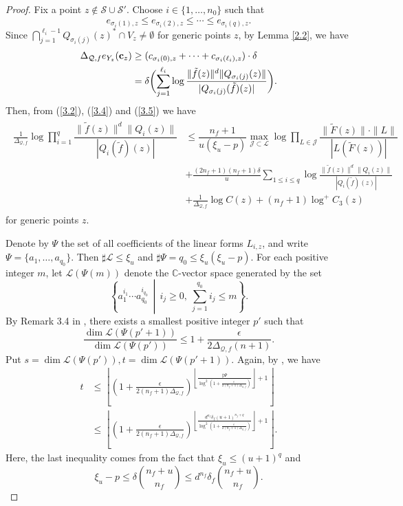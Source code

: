 \documentclass[12pt,leqno]{amsart}
\newcommand{\C}{{\mathbb{C}}}
\numberwithin{equation}{section}
\begin{document}
\begin{proof}
Fix a point $z\not\in\mathcal S\cup \mathcal S'$. Choose $i\in\{1,\ldots,n_0\}$ such that
$$ e_{\sigma_i(1),z}\le e_{\sigma_i(2),z}\le\cdots\le e_{\sigma_i(q),z}.$$
Since $\bigcap_{j=1}^{\ell_i-1}Q_{\sigma_i(j)}(z)^*\cap V_z\ne\emptyset$ for generic points $z$, by Lemma \ref{2.2}, we have
\begin{align}\label{3.5}
\begin{split}
\Delta_{\mathcal Q,f}e_{Y_z}({\bf c}_z)&\ge (c_{\sigma_i(0),z}+\cdots +c_{\sigma_i(\ell_i),z})\cdot\delta\\
&=\delta\biggl(\sum_{j=1}^{\ell_i}\log\frac{\|\tilde f(z)\|^d\|Q_{\sigma_i(j)}(z)\|}{|Q_{\sigma_i(j)}(\tilde f)(z)|}\biggl ).
\end{split}
\end{align}
Then, from (\ref{3.2}), (\ref{3.4}) and (\ref{3.5}) we have
\begin{align}\label{3.6}
\begin{split}
\frac{1}{\Delta_{\mathcal Q,f}}\log \prod_{i=1}^q\dfrac{\|\tilde f (z)\|^d\|Q_i(z)\|}{|Q_i(\tilde f)(z)|}
&\le\dfrac{n_f+1}{u(\xi_u-p)}\max_{\mathcal J\subset\mathcal L}\log\prod_{L\in\mathcal J}\dfrac{\|\tilde F(z)\|\cdot \|L\|}{|L(\tilde F(z))|}\\
&+\frac{(2n_f+1)(n_f+1)\delta}{u}\sum_{1\le i\le q}\log\frac{\|\tilde f(z)\|^d\|Q_{i}(z)\|}{|Q_{i}(\tilde f)(z)|}\\
&+\frac{1}{\Delta_{\mathcal Q,f}}\log C(z)+(n_f+1)\log^+C_3(z)
\end{split}
\end{align}
for generic points $z$.

Denote by $\Psi$ the set of all coefficients of the linear forms $L_{i,z}$, and write $\Psi=\{a_1,\ldots,a_{q_0}\}.$
Then $\sharp\mathcal L\le \xi_u$ and $\sharp\Psi=q_0\le \xi_u(\xi_u-p).$
For each positive integer $m$, let $\mathcal L(\Psi(m))$ denote the $\C$-vector space generated by the set
$$\left\{a_1^{i_1}\cdots a_{q_0}^{i_{q_0}}\,\middle|\,i_j\ge 0,\ \sum_{j=1}^{q_0}i_j\le m\right\}.$$
By Remark 3.4 in \cite{QT10}, there exists a smallest positive integer $p'$ such that
$$ \frac{\dim\mathcal L(\Psi (p'+1))}{\dim\mathcal L(\Psi (p'))}\le 1+\frac{\epsilon}{2\Delta_{\mathcal Q,f}(n+1)}.$$
Put $s=\dim\mathcal L(\Psi (p')), t=\dim\mathcal L(\Psi (p'+1))$. Again, by  \cite[Remark 3.4]{QT10}, we have
\begin{align*}
t&\le \left\lfloor\left(1+\frac{\epsilon}{2(n_f+1)\Delta_{\mathcal Q,f}}\right)^{\left\lfloor\frac{\sharp\Psi}{\log^2(1+\frac{\epsilon}{2(n_f+1)\Delta_{\mathcal Q,f}})}\right\rfloor+1}\right\rfloor\\
&\le \left\lfloor\left(1+\frac{\epsilon}{2(n_f+1)\Delta_{\mathcal Q,f}}\right)^{\left\lfloor\frac{d^{n_f}\delta_f(u+1)^{n_f+q}}{\log^2(1+\frac{\epsilon}{2(n_f+1)\Delta_{\mathcal Q,f}})}\right\rfloor+1}\right\rfloor.
\end{align*}
Here, the last inequality comes from the fact that $\xi_u\le (u+1)^q$ and 
$$\xi_u-p\le\delta\binom{n_f+u}{n_f}\le d^{n_f}\delta_f\binom{n_f+u}{n_f}.$$


\end{proof}
\end{document}
